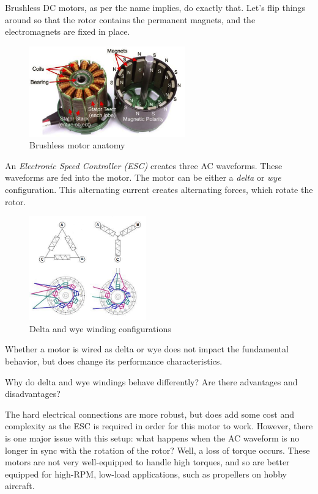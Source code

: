 Brushless DC motors, as per the name implies, do exactly that. Let's flip things around so that the rotor contains the permanent magnets, and the electromagnets are fixed in place.
\begin{figure}[H]\centering
\includegraphics[width=0.6\textwidth]{imgs/img_Mechatronics_Motors_brushless.png}
\caption{Brushless motor anatomy}
\end{figure}

An \textit{Electronic Speed Controller (ESC)} creates three AC waveforms. These waveforms are fed into the motor. The motor can be either a \textit{delta} or \textit{wye} configuration. This alternating current creates alternating forces, which rotate the rotor.

\begin{figure}[H]
	\includegraphics[width=0.45\textwidth]{imgs/delta_wye.png}
	\caption{Delta and wye winding configurations}
\end{figure}

Whether a motor is wired as delta or wye does not impact the fundamental behavior, but does change its performance characteristics.

\begin{qbox}
	Why do delta and wye windings behave differently? Are there advantages and disadvantages?
\end{qbox}

The hard electrical connections are more robust, but does add some cost and complexity as the ESC is required in order for this motor to work. However, there is one major issue with this setup: what happens when the AC waveform is no longer in sync with the rotation of the rotor? Well, a loss of torque occurs. These motors are not very well-equipped to handle high torques, and so are better equipped for high-RPM, low-load applications, such as propellers on hobby aircraft.

